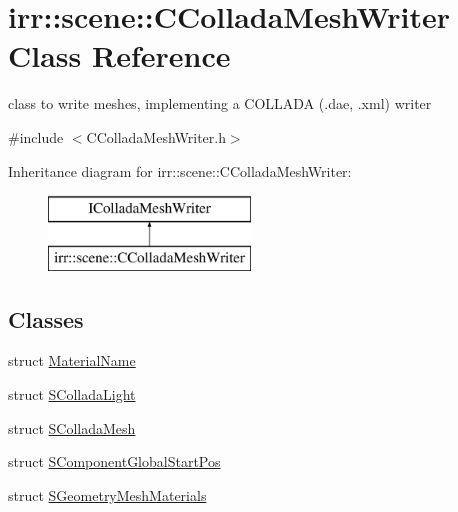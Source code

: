 \hypertarget{classirr_1_1scene_1_1_c_collada_mesh_writer}{\section{irr\-:\-:scene\-:\-:C\-Collada\-Mesh\-Writer Class Reference}
\label{classirr_1_1scene_1_1_c_collada_mesh_writer}
}


class to write meshes, implementing a C\-O\-L\-L\-A\-D\-A (.dae, .xml) writer  




{\ttfamily \#include $<$C\-Collada\-Mesh\-Writer.\-h$>$}

Inheritance diagram for irr\-:\-:scene\-:\-:C\-Collada\-Mesh\-Writer\-:\begin{figure}[H]
\begin{center}
\leavevmode
\includegraphics[height=2.000000cm]{classirr_1_1scene_1_1_c_collada_mesh_writer}
\end{center}
\end{figure}
\subsection*{Classes}
\begin{DoxyCompactItemize}
\item 
struct \hyperlink{structirr_1_1scene_1_1_c_collada_mesh_writer_1_1_material_name}{Material\-Name}
\item 
struct \hyperlink{structirr_1_1scene_1_1_c_collada_mesh_writer_1_1_s_collada_light}{S\-Collada\-Light}
\item 
struct \hyperlink{structirr_1_1scene_1_1_c_collada_mesh_writer_1_1_s_collada_mesh}{S\-Collada\-Mesh}
\item 
struct \hyperlink{structirr_1_1scene_1_1_c_collada_mesh_writer_1_1_s_component_global_start_pos}{S\-Component\-Global\-Start\-Pos}
\item 
struct \hyperlink{structirr_1_1scene_1_1_c_collada_mesh_writer_1_1_s_geometry_mesh_materials}{S\-Geometry\-Mesh\-Materials}
\end{DoxyCompactItemize}
